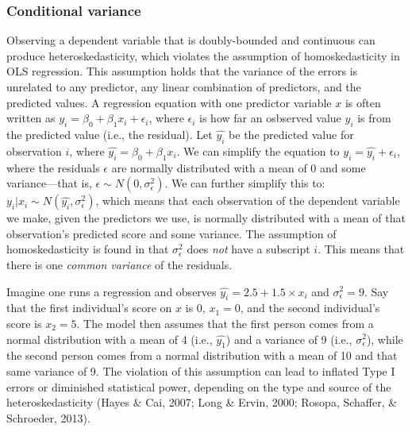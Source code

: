 \documentclass[english,,man]{apa6}
\begin{document}
\hypertarget{conditional-variance}{%
\subsubsection{Conditional variance}\label{conditional-variance}}

Observing a dependent variable that is doubly-bounded and continuous can produce heteroskedasticity, which violates the assumption of homoskedasticity in OLS regression. This assumption holds that the variance of the errors is unrelated to any predictor, any linear combination of predictors, and the predicted values. A regression equation with one predictor variable \(x\) is often written as \(y_i = \beta_0 + \beta_1x_i + \epsilon_i\), where \(\epsilon_i\) is how far an osbserved value \(y_i\) is from the predicted value (i.e., the residual). Let \(\hat{y_i}\) be the predicted value for observation \(i\), where \(\hat{y_i} = \beta_0 + \beta_1x_i\). We can simplify the equation to \(y_i = \hat{y_i} + \epsilon_i\), where the residuals \(\epsilon\) are normally distributed with a mean of 0 and some variance---that is, \(\epsilon \sim N(0, \sigma^2_\epsilon)\). We can further simplify this to: \(y_i|x_i \sim N(\hat{y_i}, \sigma^2_\epsilon)\), which means that each observation of the dependent variable we make, given the predictors we use, is normally distributed with a mean of that observation's predicted score and some variance. The assumption of homoskedasticity is found in that \(\sigma^2_\epsilon\) does \emph{not} have a subscript \(i\). This means that there is one \emph{common variance} of the residuals.

Imagine one runs a regression and observes \(\hat{y_i} = 2.5 + 1.5 \times x_i\) and \(\sigma^2_\epsilon = 9\). Say that the first individual's score on \(x\) is 0, \(x_1 = 0\), and the second individual's score is \(x_2 = 5\). The model then assumes that the first person comes from a normal distribution with a mean of 4 (i.e., \(\hat{y_1}\)) and a variance of 9 (i.e., \(\sigma^2_\epsilon\)), while the second person comes from a normal distribution with a mean of 10 and that same variance of 9. The violation of this assumption can lead to inflated Type I errors or diminished statistical power, depending on the type and source of the heteroskedasticity (Hayes \& Cai, 2007; Long \& Ervin, 2000; Rosopa, Schaffer, \& Schroeder, 2013).
\end{document}
